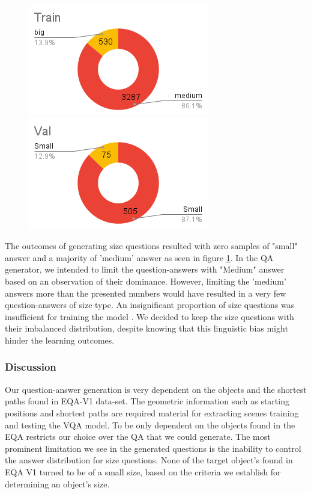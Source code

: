\begin{figure}[H]
\includegraphics[scale=0.45]{latex/images/TrAnSi.png}
\includegraphics[scale=0.45]{latex/images/VlAnSi.png}
\caption{}
\label{fig:AnsDist}
\end{figure}

The outcomes of generating size questions resulted with zero samples of "small" answer and a majority of 'medium' answer as seen in figure \ref{fig:AnsDist}. In the QA generator, we intended to limit the question-answers with "Medium" answer based on an observation of their dominance. However, limiting the 'medium' answers more than the presented numbers would have resulted in a very few question-answers of size type. An insignificant proportion of size questions was insufficient for training the model . We decided to keep the size questions with their imbalanced distribution, despite knowing that this linguistic bias might hinder the learning outcomes.  

\subsubsection{Discussion}

Our question-answer generation is very dependent on the objects and the shortest paths found in EQA-V1 data-set. The geometric information such as  starting positions and shortest paths are required material for extracting scenes training and testing the VQA model. To be only dependent on the objects found in the EQA restricts our choice over the QA that we could generate. The most prominent limitation we see in the generated questions is the inability to control the answer distribution for size questions. None of the target object's found in EQA V1 turned to be of a small size, based on the criteria we establish for determining an object's size. 

